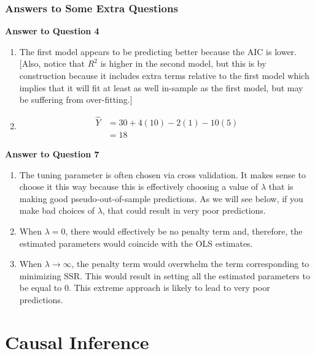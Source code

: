 \documentclass[
  letterpaper,
  DIV=11,
  numbers=noendperiod]{scrreprt}
\begin{document}
\section{Answers to Some Extra
Questions}\label{answers-to-some-extra-questions-1}

\textbf{Answer to Question 4}

\begin{enumerate}
\def\labelenumi{\alph{enumi})}
\item
  The first model appears to be predicting better because the AIC is
  lower. {[}Also, notice that \(R^2\) is higher in the second model, but
  this is by construction because it includes extra terms relative to
  the first model which implies that it will fit at least as well
  in-sample as the first model, but may be suffering from
  over-fitting.{]}
\item
  \begin{align*}
     \hat{Y} &= 30 + 4 (10) - 2 (1) - 10 (5) \\
     &= 18
   \end{align*}
\end{enumerate}

\textbf{Answer to Question 7}

\begin{enumerate}
\def\labelenumi{\alph{enumi})}
\item
  The tuning parameter is often chosen via cross validation. It makes
  sense to choose it this way because this is effectively choosing a
  value of \(\lambda\) that is making good pseudo-out-of-sample
  predictions. As we will see below, if you make bad choices of
  \(\lambda\), that could result in very poor predictions.
\item
  When \(\lambda=0\), there would effectively be no penalty term and,
  therefore, the estimated parameters would coincide with the OLS
  estimates.
\item
  When \(\lambda \rightarrow \infty\), the penalty term would overwhelm
  the term corresponding to minimizing SSR. This would result in setting
  all the estimated parameters to be equal to 0. This extreme approach
  is likely to lead to very poor predictions.
\end{enumerate}

\part{Causal Inference}

\end{document}
